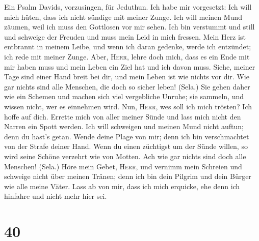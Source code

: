  Ein Psalm Davids, vorzusingen, für Jeduthun.
 Ich habe mir vorgesetzt: Ich will mich hüten, dass ich
nicht sündige mit meiner Zunge. Ich will meinen Mund zäumen, weil ich
muss den Gottlosen vor mir sehen.  Ich bin verstummt und
still und schweige der Freuden und muss mein Leid in mich fressen.
 Mein Herz ist entbrannt in meinem Leibe, und wenn ich
daran gedenke, werde ich entzündet; ich rede mit meiner Zunge.
 Aber, \textsc{Herr}, lehre doch mich, dass es ein Ende
mit mir haben muss und mein Leben ein Ziel hat und ich davon muss.
 Siehe, meiner Tage sind einer Hand breit bei dir, und
mein Leben ist wie nichts vor dir. Wie gar nichts sind alle Menschen,
die doch so sicher leben! (Sela.)  Sie gehen daher wie ein
Schemen und machen sich viel vergebliche Unruhe; sie sammeln, und wissen
nicht, wer es einnehmen wird.  Nun, \textsc{Herr}, wes
soll ich mich trösten? Ich hoffe auf dich.  Errette mich
von aller meiner Sünde und lass mich nicht den Narren ein Spott werden.
 Ich will schweigen und meinen Mund nicht auftun; denn du
hast's getan.  Wende deine Plage von mir; denn ich bin
verschmachtet von der Strafe deiner Hand.  Wenn du einen
züchtigst um der Sünde willen, so wird seine Schöne verzehrt wie von
Motten. Ach wie gar nichts sind doch alle Menschen! (Sela.)
 Höre mein Gebet, \textsc{Herr}, und vernimm mein
Schreien und schweige nicht über meinen Tränen; denn ich bin dein
Pilgrim und dein Bürger wie alle meine Väter.  Lass ab
von mir, dass ich mich erquicke, ehe denn ich hinfahre und nicht mehr
hier sei.

\hypertarget{section-39}{%
\section{40}\label{section-39}}

